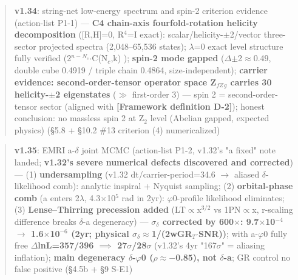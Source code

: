 \documentclass[12pt]{article}
\newcommand{\mtag}[1]{\textbf{[#1]}}
\newcommand{\up}[1]{\ensuremath{^{#1}}}
\newcommand{\down}[1]{\ensuremath{_{#1}}}
\begin{document}
\begin{quote}
\textbf{v1.34}: string-net low-energy spectrum and spin-2 criterion evidence (action-list P1-1) --- \textbf{C4 chain-axis fourfold-rotation helicity decomposition} ([R,H]=0, R\up{4}=I exact): scalar/helicity-\ensuremath{\pm}2/vector three-sector projected spectra (2,048--65,536 states); \ensuremath{\lambda}=0 exact level structure fully verified (2\up{n-N\down{c}}\ensuremath{\cdot}C(N\down{c},k) \checkmark); \textbf{spin-2 mode gapped} (\ensuremath{\Delta}\ensuremath{\pm}2\ensuremath{\approx}0.49, double cube 0.4919 / triple chain 0.4864, size-independent); \textbf{carrier evidence: second-order-tensor operator space Z\down{fZ}\down{g} carries 30 helicity-\ensuremath{\pm}2 eigenstates} (\ensuremath{\gg} first-order 3) --- spin 2 = second-order-tensor sector (aligned with \mtag{Framework definition D-2}); honest conclusion: no massless spin 2 at Z\down{2} level (Abelian gapped, expected physics) (\S{}5.8 + \S{}10.2 \#13 criterion (4) numericalized)
\end{quote}

\begin{quote}
\textbf{v1.35}: EMRI a-\ensuremath{\delta} joint MCMC (action-list P1-2, v1.32's "a fixed" note landed; \textbf{v1.32's severe numerical defects discovered and corrected}) --- (1) \textbf{undersampling} (v1.32 dt/carrier-period=34.6 \ensuremath{\to} aliased \ensuremath{\delta}-likelihood comb): analytic inspiral + Nyquist sampling; (2) \textbf{orbital-phase comb} (a enters 2\ensuremath{\lambda}, 4.3\ensuremath{\times}10\up{5} rad in 2yr): \ensuremath{\varphi}0-profile likelihood eliminates; (3) \textbf{Lense--Thirring precession added} (LT\ensuremath{\propto}x\up{3/2} vs 1PN\ensuremath{\propto}x, r-scaling difference breaks \ensuremath{\delta}-a degeneracy) --- \textbf{\ensuremath{\sigma}\down{\delta{}} corrected by 600\ensuremath{\times}: 9.7\ensuremath{\times}10\up{-4} \ensuremath{\to} 1.6\ensuremath{\times}10\up{-6} (2yr; physical \ensuremath{\sigma}\down{\delta{}}\ensuremath{\approx}1/(2wGR\down{T}\ensuremath{\cdot}SNR))}; with a-\ensuremath{\varphi}0 fully free \textbf{\ensuremath{\Delta}lnL=357/396 \ensuremath{\implies} 27\ensuremath{\sigma}/28\ensuremath{\sigma}} (v1.32's 4yr "167\ensuremath{\sigma}" = aliasing inflation); \textbf{main degeneracy \ensuremath{\delta}-\ensuremath{\varphi}0 (\ensuremath{\rho}\ensuremath{\approx}\ensuremath{-}0.85), not \ensuremath{\delta}-a}; GR control no false positive (\S{}4.5b + \S{}9 S-E1)
\end{quote}
\end{document}
